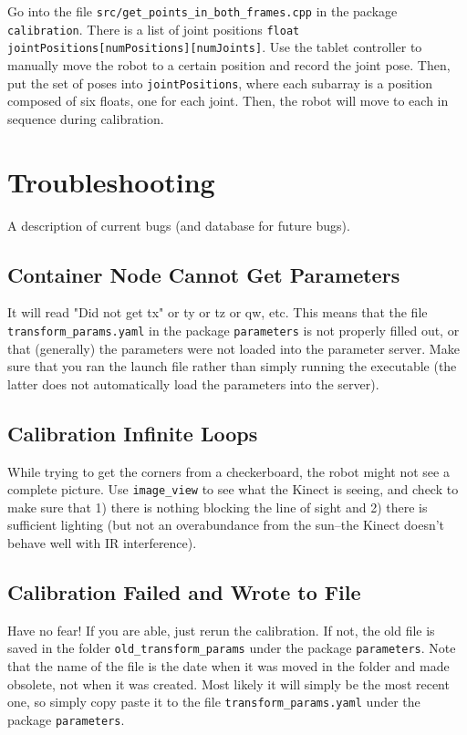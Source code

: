 \documentclass{article}
\begin{document}
Go into the file \texttt{src/get\_points\_in\_both\_frames.cpp} in the package \texttt{calibration}. There is a list of joint positions \texttt{float jointPositions[numPositions][numJoints]}. Use the tablet controller to manually move the robot to a certain position and record the joint pose. Then, put the set of poses into \texttt{jointPositions}, where each subarray is a position composed of six floats, one for each joint. Then, the robot will move to each in sequence during calibration.

\section{Troubleshooting}

A description of current bugs (and database for future bugs).

\subsection{Container Node Cannot Get Parameters}

It will read "Did not get tx" or ty or tz or qw, etc. This means that the file \texttt{transform\_params.yaml} in the package \texttt{parameters} is not properly filled out, or that (generally) the parameters were not loaded into the parameter server. Make sure that you ran the launch file rather than simply running the executable (the latter does not automatically load the parameters into the server).

\subsection{Calibration Infinite Loops}

While trying to get the corners from a checkerboard, the robot might not see a complete picture. Use \texttt{image\_view} to see what the Kinect is seeing, and check to make sure that 1) there is nothing blocking the line of sight and 2) there is sufficient lighting (but not an overabundance from the sun--the Kinect doesn't behave well with IR interference). 

\subsection{Calibration Failed and Wrote to File}

Have no fear! If you are able, just rerun the calibration. If not, the old file is saved in the folder \texttt{old\_transform\_params} under the package \texttt{parameters}. Note that the name of the file is the date when it was moved in the folder and made obsolete, not when it was created. Most likely it will simply be the most recent one, so simply copy paste it to the file \texttt{transform\_params.yaml} under the package \texttt{parameters}.
\end{document}
